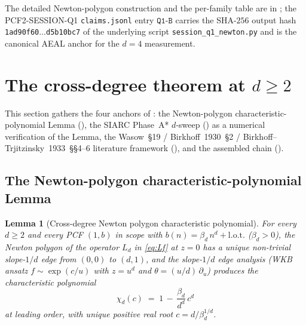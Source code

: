 \documentclass[11pt,reqno]{amsart}
\theoremstyle{plain}
\newtheorem{lemma}[theorem]{Lemma}
\theoremstyle{definition}
\theoremstyle{remark}
\begin{document}
The detailed Newton-polygon construction and the per-family
table are in
\cite[\texttt{newton\_polygon\_d4.tex}]{papanokechi_pcf2_v13};
the PCF2-SESSION-Q1 \texttt{claims.jsonl} entry
$\texttt{Q1-B}$ carries the SHA-$256$ output hash
\texttt{1ad90f60$\dots$d5b10bc7} of the underlying script
\texttt{session\_q1\_newton.py} and is the canonical AEAL
anchor for the $d = 4$ measurement.

\section{The cross-degree theorem at \texorpdfstring{$d \ge 2$}{d>=2}}
\label{sec:cross-degree}

This section gathers the four anchors of :
the Newton-polygon characteristic-polynomial Lemma
(), the SIARC Phase~A* $d$-sweep
() as a numerical verification of
the Lemma, the Wasow~\S19 / Birkhoff~1930~\S2 /
Birkhoff--Trjitzinsky~1933~\S\S4--6 literature framework
(), and the
assembled chain ().

\subsection{The Newton-polygon characteristic-polynomial Lemma}
\label{ssec:newton-poly-lemma}

\begin{lemma}[Cross-degree Newton polygon characteristic polynomial]
\label{lem:newton-poly-chi-d}
For every $d \ge 2$ and every PCF $(1, b)$ in scope with
$b(n) = \beta_d\,n^d + \mathrm{l.o.t.}$ ($\beta_d > 0$),
the Newton polygon of the operator $L_d$ in \eqref{eq:Lf} at
$z = 0$ has a unique non-trivial slope-$1/d$ edge from
$(0, 0)$ to $(d, 1)$, and the slope-$1/d$ edge analysis
(WKB ansatz $f \sim \exp(c/u)$ with $z = u^d$ and
$\theta = (u/d)\,\partial_u$) produces the characteristic
polynomial
\[
  \chi_d(c) \;=\; 1 \,-\, \frac{\beta_d}{d^d}\,c^d
\]
at leading order, with unique positive real root
$c = d / \beta_d^{1/d}$.
\end{lemma}
\end{document}
